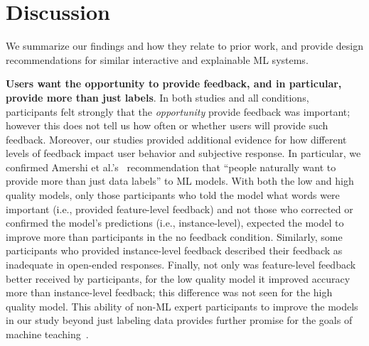 \section{Discussion}
We summarize our findings and how they relate to prior work, and provide design recommendations for similar interactive and explainable ML systems.  %
%
%
%

\textbf{Users want the opportunity to provide feedback, and in particular, provide more than just labels}. 
%
%
In both studies and all conditions, participants felt strongly that the \textit{opportunity} provide feedback was important; however this does not tell us how often or whether users will  provide such feedback. Moreover, our studies provided additional evidence for how different levels of feedback impact user behavior and subjective response. In particular, we confirmed Amershi et al.'s~\cite{Amershi2014PowerLearning} recommendation that ``people naturally want to provide more than just data labels'' to ML models. 
%
With both the low and high quality models, only those participants who told the model what words were important (i.e., provided feature-level feedback) and not those who corrected or confirmed the model's predictions (i.e., instance-level), expected the model to improve more than participants in the no feedback condition. Similarly, some participants who provided instance-level feedback described their feedback as inadequate in open-ended responses.
%
Finally, not only was feature-level feedback better received by participants, for the low quality model it improved accuracy more than instance-level feedback; this difference was not seen for the high quality model. This ability of non-ML expert participants to improve the models in our study beyond just labeling data provides further promise for the goals of machine teaching~\cite{Wall2019UsingTeaching}.  


